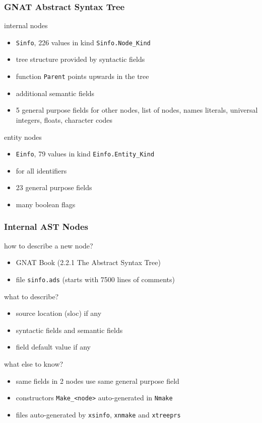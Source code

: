 \documentclass{beamer}
\newcommand{\vs}{\vspace{0.5cm}}
\newenvironment{specialframe}{%
  \begin{frame}[fragile,environment=specialframe]}{\end{frame}}
\begin{document}
\begin{specialframe}
  \frametitle{GNAT Abstract Syntax Tree}

\begin{block}{internal nodes}
  \begin{itemize}
  \item \verb|Sinfo|, 226 values in kind \verb|Sinfo.Node_Kind|
  \item tree structure provided by syntactic fields
  \item function \verb|Parent| points upwards in the tree
  \item additional semantic fields
  \item 5 general purpose fields for other nodes, list of nodes, names
    literals, universal integers, floats, character codes
  \end{itemize}
\end{block}

\begin{block}{entity nodes}
  \begin{itemize}
  \item \verb|Einfo|, 79 values in kind \verb|Einfo.Entity_Kind|
  \item for all identifiers
  \item 23 general purpose fields
  \item many boolean flags
  \end{itemize}
\end{block}

\end{specialframe}

\begin{specialframe}
  \frametitle{Internal AST Nodes}

how to describe a new node?
\begin{itemize}
\item GNAT Book (2.2.1 The Abstract Syntax Tree)
\item file \verb|sinfo.ads| (starts with 7500 lines of comments)
\end{itemize}

\vs

what to describe?
\begin{itemize}
\item source location (sloc) if any
\item syntactic fields and semantic fields
\item field default value if any
\end{itemize}

\vs

what else to know?
\begin{itemize}
\item same fields in 2 nodes use same general purpose field
\item constructors \verb|Make_<node>| auto-generated in \verb|Nmake|
\item files auto-generated by \verb|xsinfo|, \verb|xnmake| and \verb|xtreeprs|
\end{itemize}

\end{specialframe}
\end{document}
